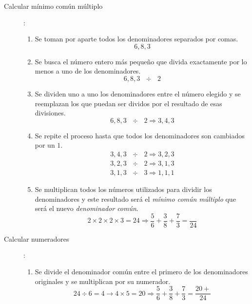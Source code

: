 \begin{description}
\item[Calcular mínimo común múltiplo]:
\begin{enumerate}
\item Se toman por aparte todos los denominadores separados por comas.\\
\begin{equation*}
6, 8, 3
\end{equation*}
\item Se busca el número entero más pequeño que divida exactamente por lo menos a uno de los denominadores.\\
\begin{equation*}
6, 8, 3 \text{ }\div \text{ } 2
\end{equation*}
\item Se dividen uno a uno los denominadores entre el número elegido y se reemplazan los que puedan ser dividos por el resultado de esas divisiones.\\
\begin{equation*}
6, 8, 3 \text{ }\div \text{ } 2 \Rightarrow 3, 4, 3
\end{equation*}
\item Se repite el proceso hasta que todos los denominadores son cambiados por un $1$.\\
\begin{eqnarray*}
3, 4, 3 \text{ }\div \text{ } 2 \Rightarrow 3, 2, 3\\
3, 2, 3 \text{ }\div \text{ } 2 \Rightarrow 3, 1, 3\\
3, 1, 3 \text{ }\div \text{ } 3 \Rightarrow 1, 1, 1
\end{eqnarray*}
\item Se multiplican todos los números utilizados para dividir los denominadores y este resultado será el \emph{mínimo común múltiplo} que será el nuevo \emph{denominador común}.
\begin{equation*}
2 \times 2 \times 2 \times 3 = 24 \Rightarrow \dfrac{5}{6}+\dfrac{3}{8}+\dfrac{7}{3}=\dfrac{}{24}
\end{equation*}
\end{enumerate}
\item[Calcular numeradores]:
\begin{enumerate}
\item Se divide el denominador común entre el primero de los denominadores originales y se multiplican por su numerador.
\begin{equation*}
24 \div 6 = 4 \rightarrow 4\times 5 = 20 \Rightarrow \dfrac{5}{6}+\dfrac{3}{8}+\dfrac{7}{3}=\dfrac{20+}{24}

\end{equation*}
\end{enumerate}
\end{description}
